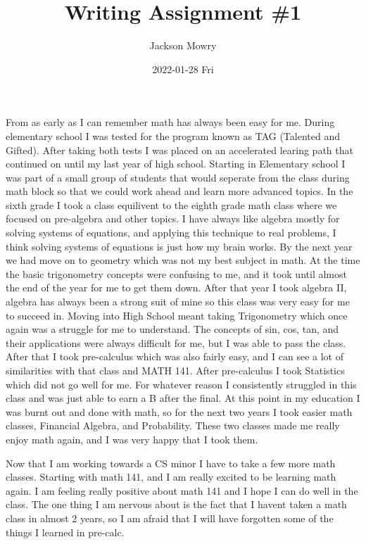 \documentclass[letterpaper, 11pt]{article}
\author{Jackson Mowry}
\date{2022-01-28 Fri}
\title{Writing Assignment \#1}
\begin{document}
\maketitle
\tableofcontents

From as early as I can remember math has always been easy for me. During elementary school I was tested for the program known as TAG (Talented and Gifted). After taking both tests I was placed on an accelerated learing path that continued on until my last year of high school. Starting in Elementary school I was part of a small group of students that would seperate from the class during math block so that we could work ahead and learn more advanced topics.  In the sixth grade I took a class equilivent to the eighth grade math class where we focused on pre-algebra and other topics. I have always like algebra mostly for solving systems of equations, and applying this technique to real problems, I think solving systems of equations is just how my brain works. By the next year we had move on to geometry which was not my best subject in math. At the time the basic trigonometry concepts were confusing to me, and it took until almost the end of the year for me to get them down. After that year I took algebra II, algebra has always been a strong suit of mine so this class was very easy for me to succeed in. Moving into High School meant taking Trigonometry which once again was a struggle for me to understand. The concepts of sin, cos, tan, and their applications were always difficult for me, but I was able to pass the class. After that I took pre-calculus which was also fairly easy, and I can see a lot of similarities with that class and MATH 141. After pre-calculus I took Statistics which did not go well for me. For whatever reason I consistently struggled in this class and was just able to earn a B after the final. At this point in my education I was burnt out and done with math, so for the next two years I took easier math classes, Financial Algebra, and Probability. These two classes made me really enjoy math again, and I was very happy that I took them. 

Now that I am working towards a CS minor I have to take a few more math classes. Starting with math 141, and I am really excited to be learning math again. I am feeling really positive about math 141 and I hope I can do well in the class. The one thing I am nervous about is the fact that I havent taken a math class in almost 2 years, so I am afraid that I will have forgotten some of the things I learned in pre-calc.  
\end{document}
